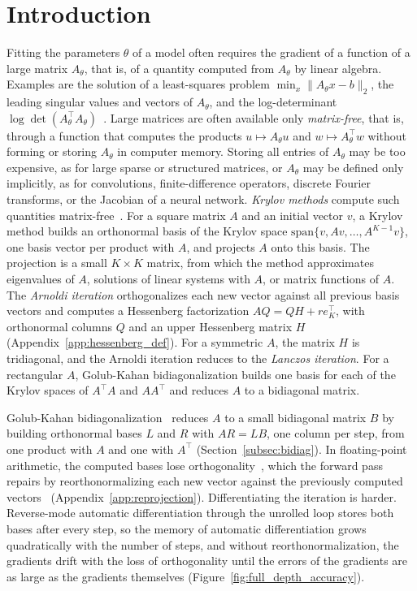 \documentclass[a4paper,12pt]{article}
\theoremstyle{definition}
\begin{document}
\section{Introduction}
Fitting the parameters $\theta$ of a model often requires the gradient of a function of a large matrix $A_\theta$, that is, of a quantity computed from $A_\theta$ by linear algebra. Examples are the solution of a least-squares problem $\min_x \|A_\theta x - b\|_2$, the leading singular values and vectors of $A_\theta$, and the log-determinant $\log\det(A_\theta^\top A_\theta)$~\citep{kraemer2024gradients}. Large matrices are often available only \emph{matrix-free}, that is, through a function that computes the products $u \mapsto A_\theta u$ and $w \mapsto A_\theta^\top w$ without forming or storing $A_\theta$ in computer memory. Storing all entries of $A_\theta$ may be too expensive, as for large sparse or structured matrices, or $A_\theta$ may be defined only implicitly, as for convolutions, finite-difference operators, discrete Fourier transforms, or the Jacobian of a neural network. \emph{Krylov methods} compute such quantities matrix-free~\citep{golub2013matrix}. For a square matrix $A$ and an initial vector $v$, a Krylov method builds an orthonormal basis of the Krylov space $\text{span}\{v, Av, \dots, A^{K-1}v\}$, one basis vector per product with $A$, and projects $A$ onto this basis. The projection is a small $K \times K$ matrix, from which the method approximates eigenvalues of $A$, solutions of linear systems with $A$, or matrix functions of $A$. The \emph{Arnoldi iteration} orthogonalizes each new vector against all previous basis vectors and computes a Hessenberg factorization $AQ = QH + re_K^\top$, with orthonormal columns $Q$ and an upper Hessenberg matrix $H$ (Appendix~\ref{app:hessenberg_def}). For a symmetric $A$, the matrix $H$ is tridiagonal, and the Arnoldi iteration reduces to the \emph{Lanczos iteration}. For a rectangular $A$, Golub-Kahan bidiagonalization builds one basis for each of the Krylov spaces of $A^\top A$ and $AA^\top$ and reduces $A$ to a bidiagonal matrix.

Golub-Kahan bidiagonalization~\citep{golub1965calculating} reduces $A$ to a small bidiagonal matrix $B$ by building orthonormal bases $L$ and $R$ with $AR = LB$, one column per step, from one product with $A$ and one with $A^\top$ (Section~\ref{subsec:bidiag}). In floating-point arithmetic, the computed bases lose orthogonality~\citep{paige1971computation}, which the forward pass repairs by reorthonormalizing each new vector against the previously computed vectors~\citep{golub2013matrix} (Appendix~\ref{app:reprojection}). Differentiating the iteration is harder. Reverse-mode automatic differentiation through the unrolled loop stores both bases after every step, so the memory of automatic differentiation grows quadratically with the number of steps, and without reorthonormalization, the gradients drift with the loss of orthogonality until the errors of the gradients are as large as the gradients themselves (Figure~\ref{fig:full_depth_accuracy}).
\end{document}
